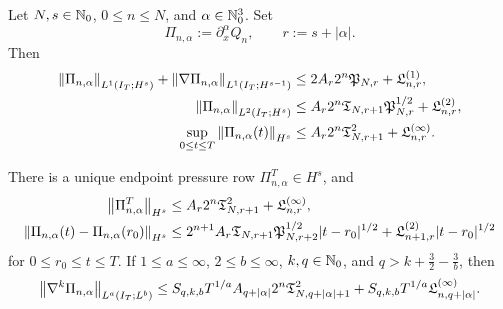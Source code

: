 \begin{theorem}
\label{thm:qc-pressure-rows}
\begin{samepage}
Let \(N,s\in\mathbb N_0\), \(0\le n\le N\), and
\(\alpha\in\mathbb N_0^3\).  Set
\[
 \Pi_{n,\alpha}:=\partial_x^\alpha Q_n,
 \qquad r:=s+|\alpha|.
\]
Then
\begin{align}
 \left\lVert \Pi_{n,\alpha}\right\rVert_{L^1(I_T;H^s)}
 +\left\lVert \nabla\Pi_{n,\alpha}\right\rVert_{L^1(I_T;H^{s-1})}
 &\le 2A_r2^n\mathfrak P_{N,r}+\mathfrak L^{(1)}_{n,r},
 \label{eq:qc-pressure-l1}\\
 \left\lVert \Pi_{n,\alpha}\right\rVert_{L^2(I_T;H^s)}
 &\le A_r2^n
 \mathfrak T_{N,r+1}\mathfrak P_{N,r}^{1/2}
 +\mathfrak L^{(2)}_{n,r},
 \label{eq:qc-pressure-l2}\\
 \sup_{0\le t\le T}\left\lVert \Pi_{n,\alpha}(t)\right\rVert_{H^s}
 &\le A_r2^n\mathfrak T_{N,r+1}^2
 +\mathfrak L^{(\infty)}_{n,r}.
 \label{eq:qc-pressure-sup}
\end{align}
\end{samepage}
There is a unique endpoint pressure row \(\Pi_{n,\alpha}^T\in H^s\), and
\begin{align}
 \left\lVert \Pi_{n,\alpha}^T\right\rVert_{H^s}
 &\le A_r2^n\mathfrak T_{N,r+1}^2
 +\mathfrak L^{(\infty)}_{n,r},
 \label{eq:qc-pressure-endpoint}\\
 \left\lVert \Pi_{n,\alpha}(t)-\Pi_{n,\alpha}(r_0)\right\rVert_{H^s}
 &\le 2^{n+1}A_r\mathfrak T_{N,r+1}
 \mathfrak P_{N,r+2}^{1/2}|t-r_0|^{1/2}
 +\mathfrak L^{(2)}_{n+1,r}|t-r_0|^{1/2}
 \label{eq:qc-pressure-modulus}
\end{align}
for \(0\le r_0\le t\le T\).  If
\(1\le a\le\infty\), \(2\le b\le\infty\),
\(k,q\in\mathbb N_0\), and
\(q>k+\frac32-\frac3b\), then
\begin{equation}
 \left\lVert \nabla^k\Pi_{n,\alpha}\right\rVert_{L^a(I_T;L^b)}
 \le
 S_{q,k,b}T^{1/a}A_{q+|\alpha|}2^n
 \mathfrak T_{N,q+|\alpha|+1}^2
 +S_{q,k,b}T^{1/a}\mathfrak L^{(\infty)}_{n,q+|\alpha|}.
 \label{eq:qc-pressure-la-lb}
\end{equation}
\end{theorem}

